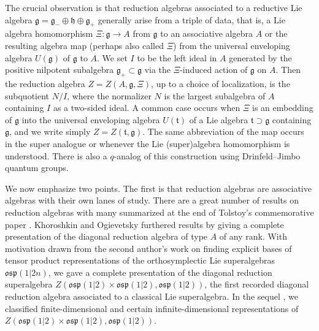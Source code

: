 \documentclass[pdftex]{sigma}
\numberwithin{equation}{section}
\begin{document}
The crucial observation is that reduction algebras associated to a reductive Lie algebra $\mathfrak{g} = \mathfrak{g}_{-} \oplus \mathfrak{h} \oplus \mathfrak{g}_{+}$ generally arise from a triple of data, that is, a Lie algebra homomorphism $\Xi\colon \mathfrak{g} \rightarrow A$ from $\mathfrak{g}$ to an associative algebra $A$ or the resulting algebra map (perhaps also called $\Xi$) from the universal enveloping algebra $U(\mathfrak{g})$ of $\mathfrak{g}$ to $A$. We set $I$ to be the left ideal in $A$ generated by the positive nilpotent subalgebra $\mathfrak{g}_{+} \subset \mathfrak{g}$ via the $\Xi$-induced action of $\mathfrak{g}$ on $A$. Then the reduction algebra $Z = Z(A,\mathfrak{g},\Xi)$, up to a choice of localization, is the subquotient $N/I$, where the normalizer $N$ is the largest subalgebra of $A$ containing $I$ as a two-sided ideal. A common case occurs when $\Xi$ is an embedding of $\mathfrak{g}$ into the universal enveloping algebra $U(\mathfrak{t})$ of a Lie algebra $\mathfrak{t} \supset \mathfrak{g}$ containing $\mathfrak{g}$, and we write simply $Z = Z(\mathfrak{t},\mathfrak{g})$. The same abbreviation of the map occurs in the super analogue or whenever the Lie (super)algebra homomorphism is understood. There is also a $q$-analog of this construction using Drinfeld--Jimbo quantum groups.

We now emphasize two points. The first is that reduction algebras are associative algebras with their own lanes of study. There are a great number of results on reduction algebras with many summarized at the end of Tolstoy's commemorative paper \cite{tolstoy2005fortieth}. Khoroshkin and Ogievetsky furthered results by giving a complete presentation of the diagonal reduction algebra \cite{khoroshkinDiagonalReductionAlgebras2010} of type $A$ of any rank.
With motivation drawn from the second author's work \cite{williamsii2020BasesInfinitedimensionalRepresentations,williamsii2024actionosp12npolytensor} on finding explicit bases of tensor product representations of the orthosymplectic Lie superalgebras~$\mathfrak{osp}(1|2n)$, we gave a complete presentation \cite[Section~3.5]{hartwigDiagonalReductionAlgebra2022c} of the diagonal reduction superalgebra $Z(\mathfrak{osp}(1|2) \times \mathfrak{osp}(1|2), \mathfrak{osp}(1|2))$, the first recorded diagonal reduction algebra associated to a classical \cite{kacClassificationSimpleLie1979} Lie superalgebra. In the sequel \cite{hartwigGhostCenterRepresentations2023}, we classified finite-dimensional and certain infinite-dimensional representations of $Z(\mathfrak{osp}(1|2) \times \mathfrak{osp}(1|2), \mathfrak{osp}(1|2))$.
\end{document}

